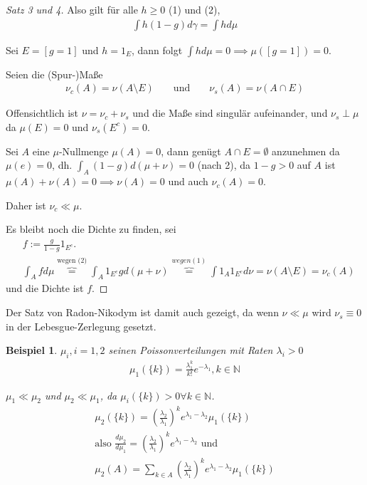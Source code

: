 \documentclass[]{article}
\newtheorem*{example}{Beispiel}
\begin{document}
\begin{proof}[Satz 3 und 4]
	Also gilt für alle $h \geq 0$ (1) und (2),
	\begin{align*}
		\int h(1-g) d\gamma = \int h d\mu
	\end{align*}

	Sei $E=[g=1]$ und $h=1_E$, dann folgt $\int h d\mu = 0 \implies \mu([g=1]) = 0$.
	
	Seien die (Spur-)Maße
	\begin{align*}
		\nu_c(A) = \nu(A\setminus E) && \text{ und } && \nu_s(A) = \nu(A \cap E)
	\end{align*}
	
	Offensichtlich ist $\nu = \nu_c + \nu_s$ und die Maße sind singulär aufeinander, und $\nu_s \perp \mu$ da $\mu(E) = 0$ und $\nu_s(E^c) = 0$.
	
	Sei $A$ eine $\mu$-Nullmenge $\mu(A)=0$, dann genügt $A \cap E = \emptyset$ anzunehmen da $\mu(e) = 0$, dh. $\int_A (1-g) d(\mu + \nu) = 0$ (nach 2), da $1-g > 0$ auf $A$ ist $\mu(A) + \nu(A) = 0 \implies \nu(A) = 0$ und auch $\nu_c(A) = 0$.
	
	Daher ist $\nu_c \ll \mu$.
	
	Es bleibt noch die Dichte zu finden, sei 
	\begin{align*}
		&f := \frac{g}{1-g} 1_{E^c}. \\
		&\int_A f d\mu \overbrace{=}^{\text{wegen (2)}} \int_A 1_{E^c} g d(\mu + \nu) \overbrace{=}^{wegen (1)} \int 1_A 1_{E^c} d\nu = \nu(A\setminus E) = \nu_c(A)
	\end{align*}
	und die Dichte ist $f$.
	
\end{proof}

Der Satz von Radon-Nikodym ist damit auch gezeigt, da wenn $\nu \ll \mu$ wird $\nu_s \equiv 0$ in der Lebesgue-Zerlegung gesetzt.

\begin{example}
	$\mu_i, i=1,2$ seinen Poissonverteilungen mit Raten $\lambda_i > 0$
	\begin{align*}
		\mu_1(\{k\}) = \frac{\lambda_1^k}{k!} e^{-\lambda_1}, k \in \mathbb{N}
	\end{align*}

	$\mu_1 \ll \mu_2$ und $\mu_2 \ll \mu_1$, da $\mu_i(\{k\})>0 \forall k \in \mathbb{N}$.
	\begin{align*}
		\mu_2(\{k\}) = \left(\frac{\lambda_2}{\lambda_1}\right)^k e^{\lambda_1 - \lambda_2} \mu_1(\{k\}) \\
		\text{also } \frac{d\mu_2}{d\mu_1} = \left(\frac{\lambda_2}{\lambda_1}\right)^k e^{\lambda_1 - \lambda_2} \text{ und}\\
		\mu_2(A) = \sum_{k\in A} \left(\frac{\lambda_2}{\lambda_1}\right)^k e^{\lambda_1 - \lambda_2} \mu_1(\{k\})
	\end{align*}
\end{example}
\end{document}
